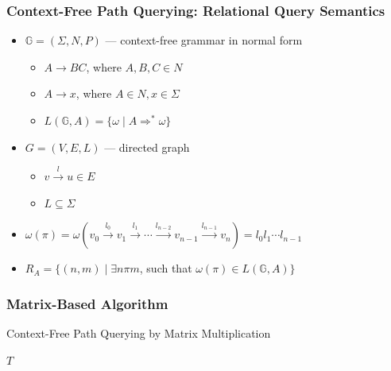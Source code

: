\documentclass[xcolor=table]{beamer}
\begin{document}
  \begin{frame}[fragile]
    \frametitle{Context-Free Path Querying: Relational Query Semantics}
    \begin{itemize}
      \item $\mathbb{G} = (\Sigma, N, P)$ --- context-free grammar in normal form
      \begin{itemize}
        \item $A \rightarrow B C$, where $A, B, C \in N$
        \item $A \rightarrow x$, where $A \in N, x \in \Sigma$
        \item $L(\mathbb{G},A) = \{ \omega \mid A \Rightarrow^* \omega \}$
      \end{itemize}
      \pause
      \item $G = (V,E,L)$ --- directed graph
        \begin{itemize}
          \item $v \xrightarrow{l} u \in E$
          \item $L \subseteq \Sigma$
        \end{itemize}
        \pause
      \item $\omega(\pi) = \omega(v_0 \xrightarrow{l_0} v_1 \xrightarrow{l_1} \cdots \xrightarrow{l_{n-2}} v_{n-1} \xrightarrow{l_{n-1}} v_n) = l_0 l_1 \cdots l_{n-1}$
      \pause
      \item $R_A = \{ (n, m) \mid \exists n \pi m$, such that $\omega(\pi) \in L(\mathbb{G},A)\}$
    \end{itemize}
  \end{frame}

  \begin{frame}[fragile] \frametitle{Matrix-Based Algorithm}
    \begin{algorithm}[H]
    \begin{algorithmic}[1]
    \caption{Context-Free Path Querying by Matrix Multiplication}

        \EndFor
        \EndWhile
    \State \Return $T$
    \EndFunction
    \end{algorithmic}
    \end{algorithm}
  \end{frame}
\end{document}
